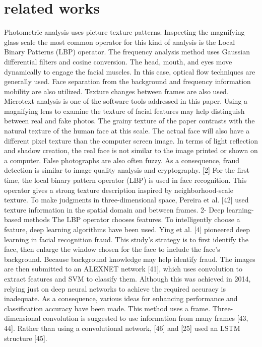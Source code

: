 \documentclass[journal]{IEEEtran}
\begin{document}
\section{related works}
Photometric analysis uses picture texture patterns. Inspecting the magnifying glass scale the most common operator for this kind of analysis is the Local Binary Patterns (LBP) operator.
The frequency analysis method uses Gaussian differential filters and cosine conversion.
The head, mouth, and eyes move dynamically to engage the facial muscles. In this case, optical flow techniques are generally used. Face separation from the background and frequency information mobility are also utilized. Texture changes between frames are also used.
Microtext analysis is one of the software tools addressed in this paper. Using a magnifying lens to examine the texture of facial features may help distinguish between real and fake photos. The grainy texture of the paper contrasts with the natural texture of the human face at this scale. The actual face will also have a different pixel texture than the computer screen image. In terms of light reflection and shadow creation, the real face is not similar to the image printed or shown on a computer. False photographs are also often fuzzy. As a consequence, fraud detection is similar to image quality analysis and cryptography.
[2] For the first time, the local binary pattern operator (LBP) is used in face recognition. This operator gives a strong texture description inspired by neighborhood-scale texture.
To make judgments in three-dimensional space, Pereira et al. [42] used texture information in the spatial domain and between frames.
2- Deep learning-based methods
The LBP operator chooses features. To intelligently choose a feature, deep learning algorithms have been used. Ying et al. [4] pioneered deep learning in facial recognition fraud. This study's strategy is to first identify the face, then enlarge the window chosen for the face to include the face's background. Because background knowledge may help identify fraud. The images are then submitted to an ALEXNET network [41], which uses convolution to extract features and SVM to classify them.
Although this was achieved in 2014, relying just on deep neural networks to achieve the required accuracy is inadequate. As a consequence, various ideas for enhancing performance and classification accuracy have been made.
This method uses a frame. Three-dimensional convolution is suggested to use information from many frames [43, 44]. Rather than using a convolutional network, [46] and [25] used an LSTM structure [45].
\end{document}
